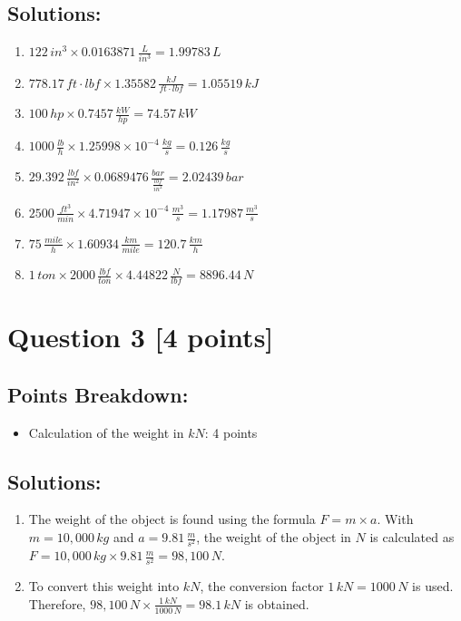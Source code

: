 \documentclass[12pt]{article}
\begin{document}
\subsection*{Solutions:}
\begin{enumerate}
    \item \(122\, in^3 \times 0.0163871\, \frac{L}{in^3} = 1.99783\, L\)
    \item \(778.17\, ft \cdot lbf \times 1.35582\, \frac{kJ}{ft \cdot lbf} = 1.05519\, kJ\)
    \item \(100\, hp \times 0.7457\, \frac{kW}{hp} = 74.57\, kW\)
    \item \(1000\, \frac{lb}{h} \times 1.25998 \times 10^{-4}\, \frac{kg}{s} = 0.126\, \frac{kg}{s}\)
    \item \(29.392\, \frac{lbf}{in^2} \times 0.0689476\, \frac{bar}{\frac{lbf}{in^2}} = 2.02439\, bar\)
    \item \(2500\, \frac{ft^3}{min} \times 4.71947 \times 10^{-4}\, \frac{m^3}{s} = 1.17987\, \frac{m^3}{s}\)
    \item \(75\, \frac{mile}{h} \times 1.60934\, \frac{km}{mile} = 120.7\, \frac{km}{h}\)
    \item \(1\, ton \times 2000\, \frac{lbf}{ton} \times 4.44822\, \frac{N}{lbf} = 8896.44\, N\)
\end{enumerate}

\newpage
\section*{Question 3 [4 points]}
\subsection*{Points Breakdown:}
\begin{itemize}
    \item Calculation of the weight in \(kN\): 4 points
\end{itemize}

\subsection*{Solutions:}
\begin{enumerate}
    \item The weight of the object is found using the formula \( F = m \times a \). With \( m = 10,000\, kg \) and \( a = 9.81\, \frac{m}{s^2} \), the weight of the object in \(N\) is calculated as \( F = 10,000\, kg \times 9.81\, \frac{m}{s^2} = 98,100\, N \).
    \item To convert this weight into \(kN\), the conversion factor \(1\, kN = 1000\, N\) is used. Therefore, \( 98,100\, N \times \frac{1\, kN}{1000\, N} = 98.1\, kN \) is obtained.
\end{enumerate}
\end{document}
